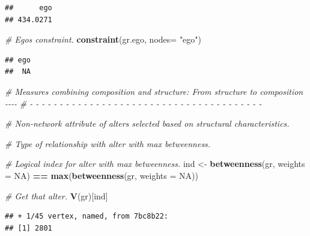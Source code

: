 \documentclass[
]{book}
\newenvironment{Shaded}{\begin{snugshade}}{\end{snugshade}}
\newcommand{\AttributeTok}[1]{\textcolor[rgb]{0.13,0.29,0.53}{#1}}
\newcommand{\CommentTok}[1]{\textcolor[rgb]{0.56,0.35,0.01}{\textit{#1}}}
\newcommand{\ConstantTok}[1]{\textcolor[rgb]{0.56,0.35,0.01}{#1}}
\newcommand{\FunctionTok}[1]{\textcolor[rgb]{0.13,0.29,0.53}{\textbf{#1}}}
\newcommand{\NormalTok}[1]{#1}
\newcommand{\OtherTok}[1]{\textcolor[rgb]{0.56,0.35,0.01}{#1}}
\newcommand{\SpecialCharTok}[1]{\textcolor[rgb]{0.81,0.36,0.00}{\textbf{#1}}}
\newcommand{\StringTok}[1]{\textcolor[rgb]{0.31,0.60,0.02}{#1}}
\begin{document}
\begin{verbatim}
##      ego 
## 434.0271
\end{verbatim}

\begin{Shaded}
\begin{Highlighting}[]
\CommentTok{\# Ego\textquotesingle{}s constraint.}
\FunctionTok{constraint}\NormalTok{(gr.ego, }\AttributeTok{nodes=} \StringTok{"ego"}\NormalTok{)}
\end{Highlighting}
\end{Shaded}

\begin{verbatim}
## ego 
##  NA
\end{verbatim}

\begin{Shaded}
\begin{Highlighting}[]
\CommentTok{\# Measures combining composition and structure: From structure to composition {-}{-}{-}{-}}
\CommentTok{\# {-} {-} {-} {-} {-} {-} {-} {-} {-} {-} {-} {-} {-} {-} {-} {-} {-} {-} {-} {-} {-} {-} {-} {-} {-} {-} {-} {-} {-} {-} {-} {-} {-} {-} {-} {-} {-} {-} {-} }

\CommentTok{\# Non{-}network attribute of alters selected based on structural characteristics.}

\CommentTok{\# Type of relationship with alter with max betweenness.}

\CommentTok{\# Logical index for alter with max betweenness.}
\NormalTok{ind }\OtherTok{\textless{}{-}} \FunctionTok{betweenness}\NormalTok{(gr, }\AttributeTok{weights =} \ConstantTok{NA}\NormalTok{) }\SpecialCharTok{==} \FunctionTok{max}\NormalTok{(}\FunctionTok{betweenness}\NormalTok{(gr, }\AttributeTok{weights =} \ConstantTok{NA}\NormalTok{))}

\CommentTok{\# Get that alter.}
\FunctionTok{V}\NormalTok{(gr)[ind]}
\end{Highlighting}
\end{Shaded}

\begin{verbatim}
## + 1/45 vertex, named, from 7bc8b22:
## [1] 2801
\end{verbatim}

\begin{Shaded}
\end{Shaded}
\end{document}
